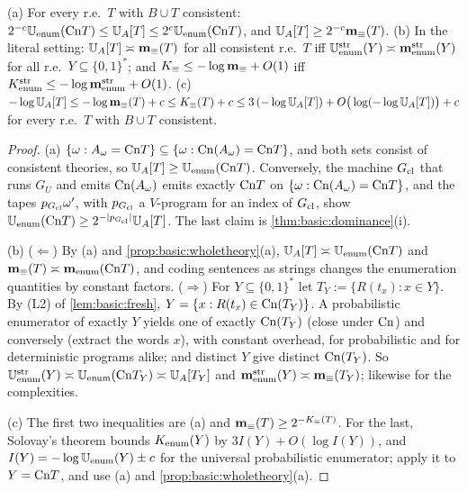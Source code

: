 \begin{proposition}\label{prop:basic:tape}
(a) For every r.e.\ $T$ with $B\cup T$ consistent: $2^{-c}\Uenum(\Cn T)\le\UA[T]\le2^c\Uenum(\Cn T)$, and $\UA[T]\ge2^{-c}\mmeq(T)$.
(b) In the literal setting: $\UA[T]\asymp\mmeq(T)$ for all consistent r.e.\ $T$ iff $\Uenum^{\rm str}(Y)\asymp\mmenum^{\rm str}(Y)$ for all r.e.\ $Y\subseteq\{0,1\}^*$; and $\Keq\le-\log\mmeq+O(1)$ iff $\Kenum^{\rm str}\le-\log\mmenum^{\rm str}+O(1)$.
(c) $-\log\UA[T]\le-\log\mmeq(T)+c\le\Keq(T)+c\le3\,(-\log\UA[T])+O\big(\log(-\log\UA[T])\big)+c$ for every r.e.\ $T$ with $B\cup T$ consistent.
\end{proposition}

\begin{proof}
(a) $\{\omega:A_\omega=\Cn T\}\subseteq\{\omega:\Cn(A_\omega)=\Cn T\}$, and both sets consist of consistent theories, so $\UA[T]\ge\Uenum(\Cn T)$. Conversely, the machine $G_{\rm cl}$ that runs $G_U$ and emits $\Cn(A_\omega)$ emits exactly $\Cn T$ on $\{\omega:\Cn(A_\omega)=\Cn T\}$, and the tapes $p_{G_{\rm cl}}\omega'$, with $p_{G_{\rm cl}}$ a $V$-program for an index of $G_{\rm cl}$, show $\Uenum(\Cn T)\ge2^{-\lvert p_{G_{\rm cl}}\rvert}\UA[T]$. The last claim is \cref{thm:basic:dominance}(i).

(b) ($\Leftarrow$) By (a) and \cref{prop:basic:wholetheory}(a), $\UA[T]\asymp\Uenum(\Cn T)$ and $\mmeq(T)\asymp\mmenum(\Cn T)$, and coding sentences as strings changes the enumeration quantities by constant factors. ($\Rightarrow$) For $Y\subseteq\{0,1\}^*$ let $T_Y:=\{R(t_x):x\in Y\}$. By (L2) of \cref{lem:basic:fresh}, $Y=\{x:R(t_x)\in\Cn(T_Y)\}$. A probabilistic enumerator of exactly $Y$ yields one of exactly $\Cn(T_Y)$ (close under $\Cn$) and conversely (extract the words $x$), with constant overhead, for probabilistic and for deterministic programs alike; and distinct $Y$ give distinct $\Cn(T_Y)$. So $\Uenum^{\rm str}(Y)\asymp\Uenum(\Cn T_Y)\asymp\UA[T_Y]$ and $\mmenum^{\rm str}(Y)\asymp\mmeq(T_Y)$; likewise for the complexities.

(c) The first two inequalities are (a) and $\mmeq(T)\ge2^{-\Keq(T)}$. For the last, Solovay's theorem bounds $\Kenum(Y)$ by $3I(Y)+O(\log I(Y))$, and $I(Y)=-\log\Uenum(Y)\pm c$ for the universal probabilistic enumerator; apply it to $Y=\Cn T$, and use (a) and \cref{prop:basic:wholetheory}(a).
\end{proof}

